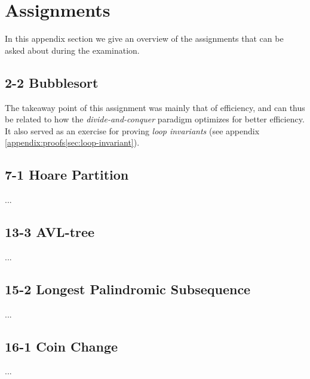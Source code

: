 
\thispagestyle{fancyplain}

\chapter{Assignments}
\label{appendix:assignments}
In this appendix section we give an overview of the assignments that can be
asked about during the examination.

\section{2-2 Bubblesort}
\label{appendix:assignments|ass:bubblesort}
The takeaway point of this assignment was mainly that of efficiency, and can
thus be related to how the \textit{divide-and-conquer} paradigm optimizes for
better efficiency. It also served as an exercise for proving \textit{loop
invariants} (see appendix \ref{appendix:proofs|sec:loop-invariant}).

\section{7-1 Hoare Partition}
\label{appendix:assignments|ass:hoare-partition}
...

\section{13-3 AVL-tree}
\label{appendix:assignments|ass:avl-tree}
...

\section{15-2 Longest Palindromic Subsequence}
\label{appendix:assignments|ass:longest-palindromic-subsequence}
...

\section{16-1 Coin Change}
\label{appendix:assignments|ass:coin-change}
...

